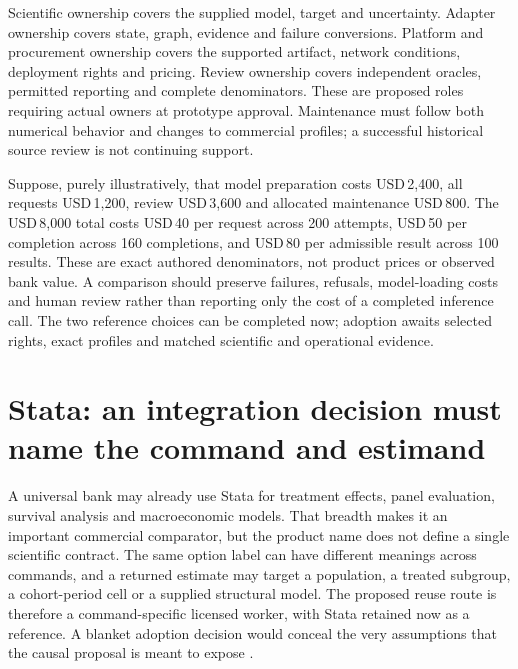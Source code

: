 Scientific ownership covers the supplied model, target and uncertainty.
Adapter ownership covers state, graph, evidence and failure conversions.
Platform and procurement ownership covers the supported artifact, network
conditions, deployment rights and pricing. Review ownership covers
independent oracles, permitted reporting and complete denominators. These
are proposed roles requiring actual owners at prototype approval.
Maintenance must follow both numerical behavior and changes to commercial
profiles; a successful historical source review is not continuing support.
\citep{exec25_bn_commercial_choice}

Suppose, purely illustratively, that model preparation costs USD\,2,400,
all requests USD\,1,200, review USD\,3,600 and allocated maintenance
USD\,800. The USD\,8,000 total costs USD\,40 per request across 200
attempts, USD\,50 per completion across 160 completions, and USD\,80
per admissible result across 100 results. These are exact authored
denominators, not product prices or observed bank value. A comparison
should preserve failures, refusals, model-loading costs and human review
rather than reporting only the cost of a completed inference call. The
two reference choices can be completed now; adoption awaits selected
rights, exact profiles and matched scientific and operational evidence.
\citep{exec25_bn_commercial_choice}
\label{sec:exec25-bn-commercial-reuse-end}


\section{Stata: an integration decision must name the command and estimand}
\label{sec:exec24-stata-reuse}

A universal bank may already use Stata for treatment effects, panel
evaluation, survival analysis and macroeconomic models. That breadth makes
it an important commercial comparator, but the product name does not define
a single scientific contract. The same option label can have different
meanings across commands, and a returned estimate may target a population,
a treated subgroup, a cohort-period cell or a supplied structural model.
The proposed reuse route is therefore a command-specific licensed worker,
with Stata retained now as a reference. A blanket adoption decision would
conceal the very assumptions that the causal proposal is meant to expose
\citep{exec13_ci_stata_causal_intro,exec18_gp_stata_xthdid,
exec22_state_stata_sspace_post,exec24_stata_choice}.

